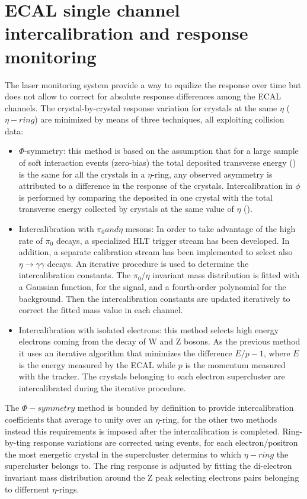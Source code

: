 \section{ECAL single channel intercalibration and response monitoring}
\label{sec:minchia_la_calibrazione}

The laser monitoring system provide a way to equilize the response over time but does not allow to
correct for absolute response differences among the ECAL channels. The crystal-by-crystal response variation
for crystals at the same $\eta$ ($\eta-ring$) are minimized by means of three techniques, all exploiting collision data:

\begin{itemize}
\item $\Phi$-symmetry: this method is based on the assumption that for a large sample of soft interaction
events (zero-bias) the total deposited transverse energy (\sumEt) is the same for all the crystals in a
$\eta$-ring, any observed asymmetry is attributed to a difference in the response of the crystals.
Intercalibration in $\phi$ is performed by comparing the \sumEt deposited in one crystal
with the total transverse energy collected by crystals at the same value of $\eta$ (\sumEtring).

\item Intercalibration with $\pi_0 and \eta$ mesons:
  In order to take advantage of the high rate of $\pi_0$ decays, a specialized HLT trigger stream has
been developed. In addition, a separate calibration stream has been implemented to select also
$\eta\to\gamma\gamma$ decays. An iterative procedure is used to determine the intercalibration constants.
The $\pi_0$/$\eta$ invariant mass distribution is fitted with a Gaussian function, for the signal, and a
fourth-order polynomial for the background. Then the intercalibration constants are updated
iteratively to correct the fitted mass value in each channel.

\item Intercalibration with isolated electrons: this method selects high energy electrons coming from the decay of
  W and Z bosons. As the previous method it uses an iterative algorithm that minimizes the difference $E/p - 1$,
  where $E$ is the energy measured by the ECAL while $p$ is the momentum measured with the tracker.
  The crystals belonging to each electron supercluster are intercalibrated during the iterative procedure.
\end{itemize}

The $\Phi-symmetry$ method is bounded by definition to provide intercalibration coefficients that average to unity
over an $\eta$-ring, for the other two methods instead this requirements is imposed after the intercalibration is completed.
Ring-by-ting response variations are corrected using \Zee events, for each electron/positron the most energetic crystal in the
supercluster determins to which $\eta-ring$ the supercluster belongs to. The ring response is adjusted by fitting the di-electron
invariant mass distribution around the Z peak selecting electrons pairs belonging to differnent $\eta$-rings.

